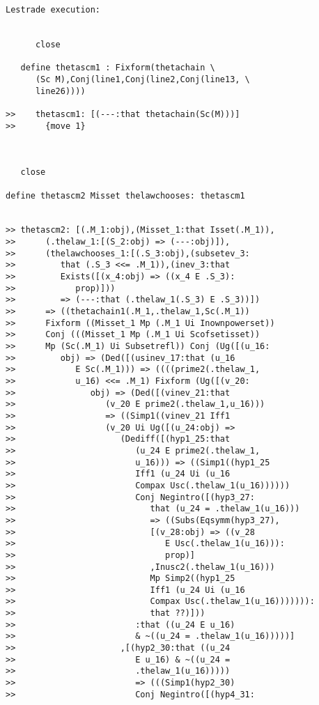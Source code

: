 \documentclass[12pt]{article}
\begin{document}
\begin{verbatim}Lestrade execution:


      close

   define thetascm1 : Fixform(thetachain \
      (Sc M),Conj(line1,Conj(line2,Conj(line13, \
      line26))))

>>    thetascm1: [(---:that thetachain(Sc(M)))]
>>      {move 1}



   close

define thetascm2 Misset thelawchooses: thetascm1


>> thetascm2: [(.M_1:obj),(Misset_1:that Isset(.M_1)),
>>      (.thelaw_1:[(S_2:obj) => (---:obj)]),
>>      (thelawchooses_1:[(.S_3:obj),(subsetev_3:
>>         that (.S_3 <<= .M_1)),(inev_3:that
>>         Exists([(x_4:obj) => ((x_4 E .S_3):
>>            prop)]))
>>         => (---:that (.thelaw_1(.S_3) E .S_3))])
>>      => ((thetachain1(.M_1,.thelaw_1,Sc(.M_1))
>>      Fixform ((Misset_1 Mp (.M_1 Ui Inownpowerset))
>>      Conj (((Misset_1 Mp (.M_1 Ui Scofsetisset))
>>      Mp (Sc(.M_1) Ui Subsetrefl)) Conj (Ug([(u_16:
>>         obj) => (Ded([(usinev_17:that (u_16
>>            E Sc(.M_1))) => ((((prime2(.thelaw_1,
>>            u_16) <<= .M_1) Fixform (Ug([(v_20:
>>               obj) => (Ded([(vinev_21:that
>>                  (v_20 E prime2(.thelaw_1,u_16)))
>>                  => ((Simp1((vinev_21 Iff1
>>                  (v_20 Ui Ug([(u_24:obj) =>
>>                     (Dediff([(hyp1_25:that
>>                        (u_24 E prime2(.thelaw_1,
>>                        u_16))) => ((Simp1((hyp1_25
>>                        Iff1 (u_24 Ui (u_16
>>                        Compax Usc(.thelaw_1(u_16))))))
>>                        Conj Negintro([(hyp3_27:
>>                           that (u_24 = .thelaw_1(u_16)))
>>                           => ((Subs(Eqsymm(hyp3_27),
>>                           [(v_28:obj) => ((v_28
>>                              E Usc(.thelaw_1(u_16))):
>>                              prop)]
>>                           ,Inusc2(.thelaw_1(u_16)))
>>                           Mp Simp2((hyp1_25
>>                           Iff1 (u_24 Ui (u_16
>>                           Compax Usc(.thelaw_1(u_16))))))):
>>                           that ??)]))
>>                        :that ((u_24 E u_16)
>>                        & ~((u_24 = .thelaw_1(u_16)))))]
>>                     ,[(hyp2_30:that ((u_24
>>                        E u_16) & ~((u_24 =
>>                        .thelaw_1(u_16)))))
>>                        => (((Simp1(hyp2_30)
>>                        Conj Negintro([(hyp4_31:

\end{verbatim}
\end{document}
